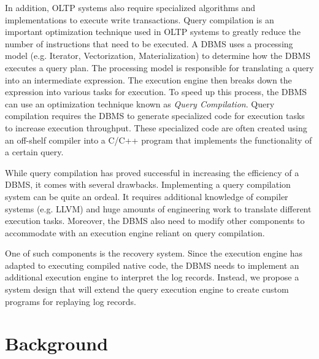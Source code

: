 \documentclass[12pt]{cmuthesis}
\begin{document}
In addition, OLTP systems also require specialized algorithms and implementations to execute write transactions. Query compilation is an important optimization technique used in OLTP systems to greatly reduce the number of instructions that need to be executed. A DBMS uses a processing model (e.g. Iterator, Vectorization, Materialization) to determine how the DBMS executes a query plan. The processing model is responsible for translating a query into an intermediate expression. The execution engine then breaks down the expression into various tasks for execution. To speed up this process, the DBMS can use an optimization technique known as \textit{Query Compilation}. Query compilation requires the DBMS to generate specialized code for execution tasks to increase execution throughput. These specialized code are often created using an off-shelf compiler into a C/C++ program that implements the functionality of a certain query.

While query compilation has proved successful in increasing the efficiency of a DBMS, it comes with several drawbacks. Implementing a query compilation system can be quite an ordeal. It requires additional knowledge of compiler systems (e.g. LLVM) and huge amounts of engineering work to translate different execution tasks. Moreover, the DBMS also need to modify other components to accommodate with an execution engine reliant on query compilation.

One of such components is the recovery system. Since the execution engine has adapted to executing compiled native code, the DBMS needs to implement an additional execution engine to interpret the log records. Instead, we propose a system design that will extend the query execution engine to create custom programs for replaying log records.

\chapter{Background}
\end{document}
